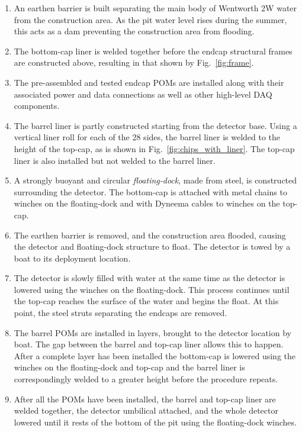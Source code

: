 \begin{enumerate}
    \item An earthen barrier is built separating the main body of Wentworth 2W water from the
          construction area. As the pit water level rises during the summer, this acts as a dam
          preventing the construction area from flooding.
    \item The bottom-cap liner is welded together before the endcap structural frames are
          constructed above, resulting in that shown by Fig.~\ref{fig:frame}.
    \item The pre-assembled and tested endcap POMs are installed along with their associated power
          and data connections as well as other high-level DAQ components.
    \item The barrel liner is partly constructed starting from the detector base. Using a vertical
          liner roll for each of the 28 sides, the barrel liner is welded to the height of the
          top-cap, as is shown in Fig.~\ref{fig:chips_with_liner}. The top-cap liner is also
          installed but not welded to the barrel liner.
    \item A strongly buoyant and circular \emph{floating-dock}, made from steel, is constructed
          surrounding the detector. The bottom-cap is attached with metal chains to winches on the
          floating-dock and with Dyneema cables to winches on the top-cap.
    \item The earthen barrier is removed, and the construction area flooded, causing the detector
          and floating-dock structure to float. The detector is towed by a boat to its deployment
          location.
    \item The detector is slowly filled with water at the same time as the detector is lowered
          using the winches on the floating-dock. This process continues until the top-cap reaches
          the surface of the water and begins the float. At this point, the steel struts
          separating the endcaps are removed.
    \item The barrel POMs are installed in layers, brought to the detector location by boat. The
          gap between the barrel and top-cap liner allows this to happen. After a complete layer
          has been installed the bottom-cap is lowered using the winches on the floating-dock and
          top-cap and the barrel liner is correspondingly welded to a greater height before the
          procedure repeats.
    \item After all the POMs have been installed, the barrel and top-cap liner are welded
          together, the detector umbilical attached, and the whole detector lowered until it rests
          of the bottom of the pit using the floating-dock winches.
\end{enumerate}


